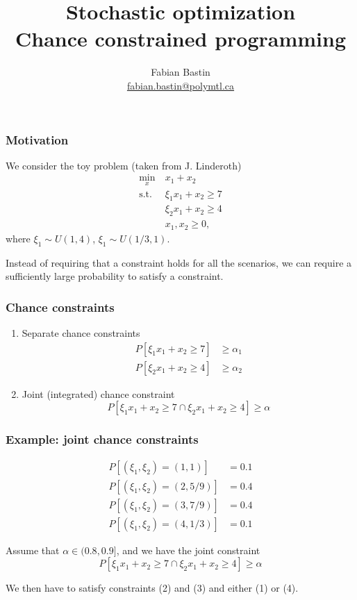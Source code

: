 \documentclass{beamer}
\title[CP]{Stochastic optimization\\Chance constrained programming}
\author{Fabian Bastin\\\url{fabian.bastin@polymtl.ca}}
\date{}
\begin{document}

\frame{\titlepage}

\begin{frame}
\frametitle{Motivation}

We consider the toy problem (taken from J. Linderoth)
\begin{align*}
\min_x\ & x_1 + x_2 \\
\mbox{s.t. } & \xi_1 x_1 + x_2 \geq 7 \\
& \xi_2 x_1 + x_2 \geq 4 \\
& x_1, x_2 \geq 0,
\end{align*}
where $\xi_1 \sim U(1,4)$, $\xi_1 \sim U(1/3,1)$.

\mbox{} 

Instead of requiring that a constraint holds for all the scenarios, we can require a sufficiently large probability to satisfy a constraint.

\end{frame}

\begin{frame}
\frametitle{Chance constraints}

\begin{enumerate}
\item 
Separate chance constraints
\begin{align*}
P [ \xi_1x_1 + x_2 \geq 7 ] &\geq \alpha_1 \\
P [ \xi_2x_1 + x_2 \geq 4 ] &\geq \alpha_2
\end{align*}
\item
Joint (integrated) chance constraint
\[
P [ \xi_1x_1 + x_2 \geq 7 \cap \xi_2x_1 + x_2 \geq 4 ] \geq \alpha
\]
\end{enumerate}

\end{frame}

\begin{frame}
\frametitle{Example: joint chance constraints}

\begin{align}
P[(\xi_1, \xi_2) = (1,1)] &= 0.1 \\
P[(\xi_1, \xi_2) = (2,5/9)] &= 0.4 \\
P[(\xi_1, \xi_2) = (3,7/9)] &= 0.4 \\
P[(\xi_1, \xi_2) = (4,1/3)] &= 0.1
\end{align}

\mbox{}

Assume that $\alpha \in (0.8,0.9]$, and we have the joint constraint
\[
P [ \xi_1x_1 + x_2 \geq 7 \cap \xi_2x_1 + x_2 \geq 4 ] \geq \alpha
\]

\mbox{}

We then have to satisfy constraints (2) and (3) and either (1) or (4).

\end{frame}
\end{document}
